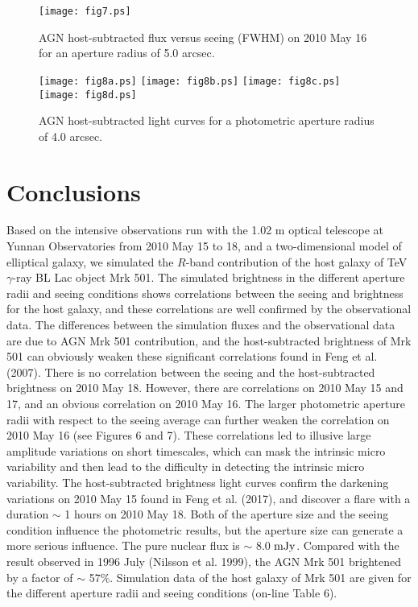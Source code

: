 \documentclass[structabstract]{raa}
\begin{document}
   \begin{figure}
   \begin{center}
        \texttt{[image: fig7.ps]}
    \end{center}
     \caption{AGN host-subtracted flux versus seeing (FWHM) on 2010 May 16 for an aperture radius of 5.0 arcsec.}
  \label{fig7}
\end{figure}

   \begin{figure}
     \begin{center}
        \texttt{[image: fig8a.ps]}
        \texttt{[image: fig8b.ps]}
        \texttt{[image: fig8c.ps]}
        \texttt{[image: fig8d.ps]}
       \end{center}
     \caption{AGN host-subtracted light curves for a photometric aperture radius of 4.0 arcsec. }
     \label{fig8}
   \end{figure}

\section{Conclusions}
  Based on the intensive observations run with the 1.02 m optical telescope at Yunnan Observatories from 2010 May 15 to 18,
  and a two-dimensional model of elliptical galaxy, we simulated the $R$-band contribution of the host galaxy of TeV $\gamma$-ray
  BL Lac object Mrk 501. The simulated brightness in the different aperture radii and seeing conditions shows correlations between
  the seeing and brightness for the host galaxy, and these correlations are well confirmed by the observational data. The differences
  between the simulation fluxes and the observational data are due to AGN Mrk 501 contribution, and the host-subtracted brightness
  of Mrk 501 can obviously weaken these significant correlations found in Feng et al. (2007). There is no correlation between the seeing
  and the host-subtracted brightness on 2010 May 18. However, there are correlations on 2010 May 15 and 17, and an obvious correlation
  on 2010 May 16. The larger photometric aperture radii with respect to the seeing average can further weaken the correlation on 2010
  May 16 (see Figures 6 and 7). These correlations led to illusive large amplitude variations on short timescales, which can mask the
  intrinsic micro variability and then lead to the difficulty in detecting the intrinsic micro variability. The host-subtracted brightness
  light curves confirm the darkening variations on 2010 May 15 found in Feng et al. (2017), and discover a flare with a duration $\sim$
  1 hours on 2010 May 18. Both of the aperture size and the seeing condition influence the photometric results, but the aperture size
  can generate a more serious influence. The pure nuclear flux is $\sim$ 8.0 $\rm{mJy}$. Compared with the result observed in 1996 July
  (Nilsson et al. 1999), the AGN Mrk 501 brightened by a factor of $\sim$ 57\%. Simulation data of the host galaxy of Mrk 501 are given
  for the different aperture radii and seeing conditions (on-line Table 6).
\end{document}
